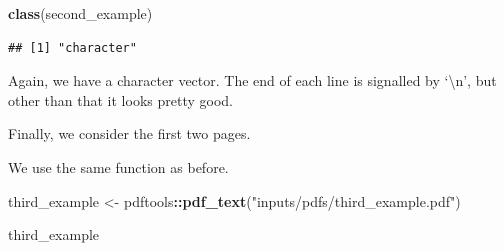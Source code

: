 \documentclass[
]{book}
\newenvironment{Shaded}{\begin{snugshade}}{\end{snugshade}}
\newcommand{\KeywordTok}[1]{\textcolor[rgb]{0.13,0.29,0.53}{\textbf{#1}}}
\newcommand{\NormalTok}[1]{#1}
\newcommand{\OperatorTok}[1]{\textcolor[rgb]{0.81,0.36,0.00}{\textbf{#1}}}
\newcommand{\StringTok}[1]{\textcolor[rgb]{0.31,0.60,0.02}{#1}}
\begin{document}
\begin{Shaded}
\begin{Highlighting}[]
\KeywordTok{class}\NormalTok{(second_example)}
\end{Highlighting}
\end{Shaded}

\begin{verbatim}
## [1] "character"
\end{verbatim}

Again, we have a character vector. The end of each line is signalled by `\textbackslash n', but other than that it looks pretty good.

Finally, we consider the first two pages.

We use the same function as before.

\begin{Shaded}
\begin{Highlighting}[]
\NormalTok{third_example <-}\StringTok{ }\NormalTok{pdftools}\OperatorTok{::}\KeywordTok{pdf_text}\NormalTok{(}\StringTok{"inputs/pdfs/third_example.pdf"}\NormalTok{)}

\NormalTok{third_example}
\end{Highlighting}
\end{Shaded}
\end{document}
